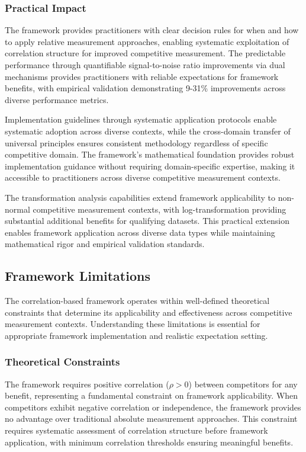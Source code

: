 \subsubsection{Practical Impact}

The framework provides practitioners with clear decision rules for when and how to apply relative measurement approaches, enabling systematic exploitation of correlation structure for improved competitive measurement. The predictable performance through quantifiable signal-to-noise ratio improvements via dual mechanisms provides practitioners with reliable expectations for framework benefits, with empirical validation demonstrating 9-31\% improvements across diverse performance metrics.

Implementation guidelines through systematic application protocols enable systematic adoption across diverse contexts, while the cross-domain transfer of universal principles ensures consistent methodology regardless of specific competitive domain. The framework's mathematical foundation provides robust implementation guidance without requiring domain-specific expertise, making it accessible to practitioners across diverse competitive measurement contexts.

The transformation analysis capabilities extend framework applicability to non-normal competitive measurement contexts, with log-transformation providing substantial additional benefits for qualifying datasets. This practical extension enables framework application across diverse data types while maintaining mathematical rigor and empirical validation standards.

\subsection{Framework Limitations}

The correlation-based framework operates within well-defined theoretical constraints that determine its applicability and effectiveness across competitive measurement contexts. Understanding these limitations is essential for appropriate framework implementation and realistic expectation setting.

\subsubsection{Theoretical Constraints}

The framework requires positive correlation ($\rho > 0$) between competitors for any benefit, representing a fundamental constraint on framework applicability. When competitors exhibit negative correlation or independence, the framework provides no advantage over traditional absolute measurement approaches. This constraint requires systematic assessment of correlation structure before framework application, with minimum correlation thresholds ensuring meaningful benefits.

